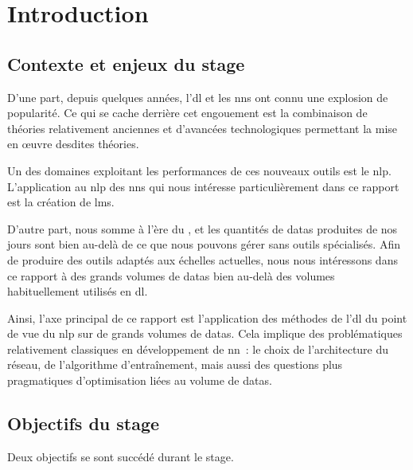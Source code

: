 \chapter{Introduction}

\section[Contexte \& Enjeux]{Contexte et enjeux du stage}

D'une part, depuis quelques années, l'\gls{dl} et les \glspl{nn} ont connu une explosion de popularité.
Ce qui se cache derrière cet engouement est la combinaison de théories relativement anciennes et d'avancées technologiques permettant la mise en œuvre desdites théories.

Un des domaines exploitant les performances de ces nouveaux outils est le \gls{nlp}.
L'application au \gls{nlp} des \glspl{nn} qui nous intéresse particulièrement dans ce rapport est la création de \glspl{lm}.

D'autre part, nous somme à l'ère du \og{}\fg{}, et les quantités de \glspl{data} produites de nos jours sont bien au-delà de ce que nous pouvons gérer sans outils spécialisés.
Afin de produire des outils adaptés aux échelles actuelles, nous nous intéressons dans ce rapport à des grands volumes de \glspl{data} bien au-delà des volumes habituellement utilisés en \gls{dl}.

Ainsi, l'axe principal de ce rapport est l'application des méthodes de l'\gls{dl} du point de vue du \gls{nlp} sur de grands volumes de \glspl{data}.
Cela implique des problématiques relativement classiques en développement de \gls{nn}~: le choix de l'architecture du réseau, de l'algorithme d'entraînement, mais aussi des questions plus pragmatiques d'optimisation liées au volume de \glspl{data}.

\section[Objectifs]{Objectifs du stage}
Deux objectifs se sont succédé durant le stage.

